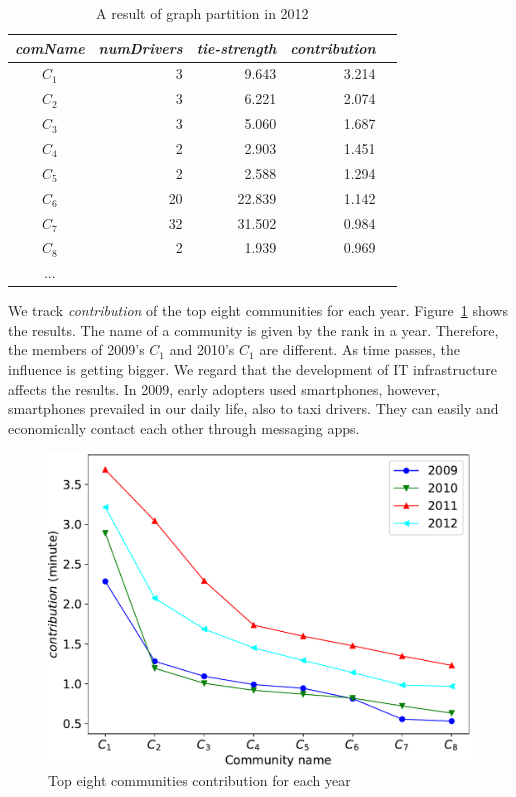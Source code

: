 \documentclass{article}
\begin{document}
\begin{table}[h]
    \caption{A result of graph partition in 2012}
    \vspace{-0.3 cm}
    \begin{center}
        \begin{tabular}{c|rrrr}
              \emph{comName}     & \multicolumn{1}{c}{\emph{numDrivers} }    & \multicolumn{1}{c}{\emph{tie-strength}}    & \multicolumn{1}{c}{\emph{contribution}} \\
          \hline
            $C_1$     & 3         & 9.643     & 3.214 \\
            $C_2$     & 3         & 6.221     & 2.074 \\
            $C_3$     & 3         & 5.060     & 1.687 \\
            $C_4$     & 2         & 2.903     & 1.451 \\
            $C_5$     & 2         & 2.588     & 1.294 \\
            $C_6$     & 20    & 22.839 & 1.142 \\
            $C_7$     & 32     & 31.502 & 0.984 \\
            $C_8$     & 2         & 1.939     & 0.969 \\
            ... & & &
        \end{tabular}
    \label{tab:partitionResult}
    \end{center}
    \vspace{-0.3 cm}
\end{table}


We track \emph{contribution} of the top eight communities for each year. Figure~\ref{fig:yearContribution} shows the results. The name of a community is given by the rank in a year. Therefore, the members of 2009's $C_1$ and 2010's $C_1$ are different. As time passes, the influence is getting bigger. We regard that the development of IT infrastructure affects the results. In 2009, early adopters used smartphones, however, smartphones prevailed in our daily life, also to taxi drivers. They can easily and economically contact each other through messaging apps.

\begin{figure} [h]
  \centering
  \includegraphics[width=.9\linewidth]{figs/yearContribution}
  \caption{Top eight communities contribution for each year}
  \label{fig:yearContribution}
\end{figure}
\end{document}
